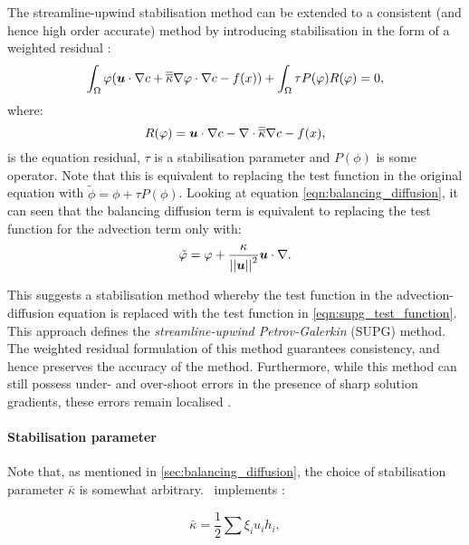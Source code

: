 The streamline-upwind stabilisation method can be extended to a consistent (and
hence high order accurate) method by introducing stabilisation in the form of a weighted
residual \citep{DoneaBook}:
\begin{equation*}
  \int_\Omega \varphi ({\mbox{\boldmath$u$}} \cdot \nabla c + \overline{\overline{\kappa}} \nabla \varphi \cdot \nabla c - f(x)) +
  \int_\Omega \tau P(\varphi) R(\varphi)
  = 0,
\end{equation*}
where:
\begin{equation*}
  R(\varphi) = {\mbox{\boldmath$u$}} \cdot \nabla c - \nabla\cdot\overline{\overline{\kappa}}\nabla  c - f(x),
\end{equation*}
is the equation residual, $\tau$ is a stabilisation parameter and $P(\phi)$ is
some operator.
Note that this is equivalent to replacing the test function in the original
equation with $\tilde{\phi} = \phi + \tau P(\phi)$.
Looking at equation \eqref{eqn:balancing_diffusion}, it can seen that the
balancing diffusion term is equivalent to replacing the test function for the
advection term only with:
\begin{equation}\label{eqn:supg_test_function}
  \tilde{\varphi} = \varphi + \frac{{\kappa}}{\left|\left| {\mbox{\boldmath$u$}} \right|\right|^2} {\mbox{\boldmath$u$}} \cdot \nabla.
\end{equation}

This suggests a stabilisation method whereby the test function in the advection-diffusion
equation is replaced with the test function in \eqref{eqn:supg_test_function}.
This approach defines the \textit{streamline-upwind Petrov-Galerkin} (SUPG) method. The
weighted residual formulation of this method guarantees consistency, and hence
preserves the accuracy of the method. Furthermore, while this method can
still possess under- and over-shoot errors in the presence of sharp solution
gradients, these errors remain localised \citep{hughes1987}.

\paragraph{Stabilisation parameter}\label{sec:stabilisation_parameter}

Note that, as mentioned in \ref{sec:balancing_diffusion}, the choice of
stabilisation parameter $\bar{\kappa}$ is somewhat arbitrary. \fluidity\ implements \citep{brooks1982, DoneaBook}:

\begin{equation}\label{eqn:md_nu_bar}
  \bar{\kappa} = \frac{1}{2} \sum{\xi_i u_i h_i},
\end{equation}

